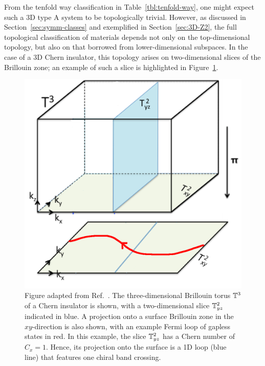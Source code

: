 From the tenfold way classification in Table~\ref{tbl:tenfold-way}, one might expect such a 3D type A system to be topologically trivial. However, as discussed in Section~\ref{sec:symm-classes} and exemplified in Section~\ref{sec:3D-Z2}, the full topological classification of materials depends not only on the top-dimensional topology, but also on that borrowed from lower-dimensional subspaces. In the case of a 3D Chern insulator, this topology arises on two-dimensional slices of the Brillouin zone; an example of such a slice is highlighted in Figure~\ref{fig:3D_Chern_insulator}.
\begin{figure}[htb!]
	\centering
	\includegraphics[width=.5\linewidth]{Images/3D_Chern_insulator}
	\caption{Figure adapted from Ref.~\cite{Mathai_math-review}. The three-dimensional Brillouin torus $\mathbb{T}^3$ of a Chern insulator is shown, with a two-dimensional slice $\mathbb{T}_{yz}^2$ indicated in blue. A projection onto a surface Brillouin zone in the $xy$-direction is also shown, with an example Fermi loop of gapless states in red. In this example, the slice $\mathbb{T}_{yz}^2$ has a Chern number of $C_{x} = 1$. Hence, its projection onto the surface is a 1D loop (blue line) that features one chiral band crossing.}
	\label{fig:3D_Chern_insulator}
\end{figure}

